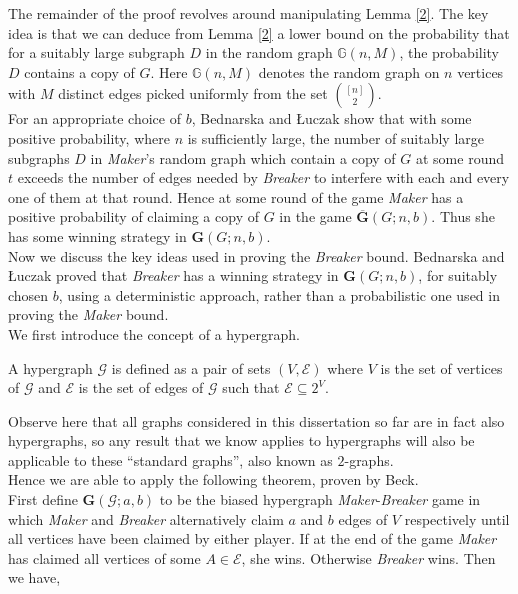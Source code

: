 \documentclass[a4paper,oneside,11pt]{report}
\begin{document}
The remainder of the proof revolves around manipulating Lemma \ref{2}. The key idea is that we can deduce from Lemma \ref{2} a lower bound on the probability that for a suitably large subgraph $D$ in the random graph $\mathbb{G}(n,M)$, the probability $D$ contains a copy of $G$. Here $\mathbb{G}(n,M)$ denotes the random graph on $n$ vertices with $M$ distinct edges picked uniformly from the set $\binom{[n]}{2}$. \\

For an appropriate choice of $b$, Bednarska and \L{}uczak show that with some positive probability, where $n$ is sufficiently large, the number of suitably large subgraphs $D$ in \textit{Maker}'s random graph which contain a copy of $G$ at some round $t$ exceeds the number of edges needed by \textit{Breaker} to interfere with each and every one of them at that round. Hence at some round of the game \textit{Maker} has a positive probability of claiming a copy of $G$ in the game $\overline{\textbf{G}}(G;n,b)$. Thus she has some winning strategy in $\textbf{G}(G;n,b)$. \\

Now we discuss the key ideas used in proving the \textit{Breaker} bound. Bednarska and \L{}uczak proved that \textit{Breaker} has a winning strategy in ${\textbf{G}}(G;n,b)$, for suitably chosen $b$, using a deterministic approach, rather than a probabilistic one used in proving the \textit{Maker} bound.\\

We first introduce the concept of a hypergraph.

\begin{definition}[hypergraph]

A hypergraph $\mathcal{G}$ is defined as a pair of sets $(V,\mathcal{E})$ where $V$ is the set of vertices of $\mathcal{G}$ and $\mathcal{E}$ is the set of edges of $\mathcal{G}$ such that $\mathcal{E} \subseteq 2^V$.
    
\end{definition}

Observe here that all graphs considered in this dissertation so far are in fact also hypergraphs, so any result that we know applies to hypergraphs will also be applicable to these ``standard graphs'', also known as $2$-graphs.\\

Hence we are able to apply the following theorem, proven by Beck.\\

First define $\textbf{G}(\mathcal{G};a,b)$ to be the biased hypergraph \textit{Maker}-\textit{Breaker} game in which \textit{Maker} and \textit{Breaker} alternatively claim $a$ and $b$ edges of $V$ respectively until all vertices have been claimed by either player. If at the end of the game \textit{Maker} has claimed all vertices of some $A \in \mathcal{E}$, she wins. Otherwise \textit{Breaker} wins. Then we have,
\end{document}

